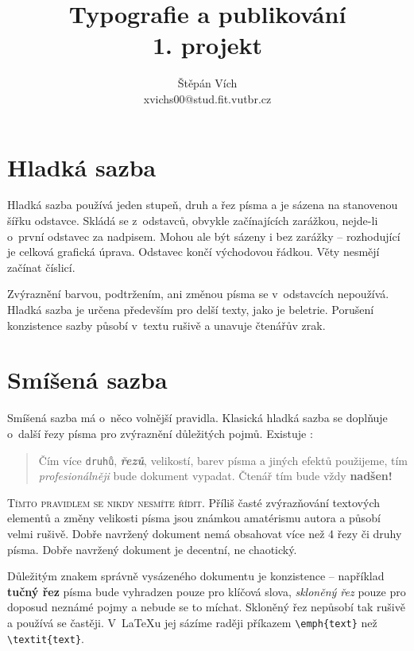 \documentclass[twocolumn, a4paper]{article}
\begin{document}
\title{Typografie a publikování \\ {\large 1. projekt}}
\author{Štěpán Vích\\xvichs00@stud.fit.vutbr.cz}
\date{}



\maketitle

\section{Hladká sazba}

Hladká sazba používá jeden stupeň, druh a řez písma a je sázena na stanovenou šířku odstavce. Skládá se z~odstavců, obvykle začínajících zarážkou, nejde-li o~první odstavec za nadpisem. Mohou ale být sázeny i bez zarážky -- rozhodující je celková grafická úprava. Odstavec končí východovou řádkou. Věty nesmějí začínat číslicí.

Zvýraznění barvou, podtržením, ani změnou písma se v~odstavcích nepoužívá. Hladká sazba je určena především pro delší texty, jako je beletrie. Porušení konzistence sazby působí v~textu rušivě a unavuje čtenářův zrak.

\section {Smíšená sazba} \label{smisena-sazba}

Smíšená sazba má o~něco volnější pravidla. Klasická hladká sazba se doplňuje o~další řezy písma pro zvýraznění důležitých pojmů. Existuje :


\begin{quotation}
Čím více \texttt{druhů}, \textbf{\textit{řezů}}, velikostí, barev písma { \selectfont a jiných efektů} použijeme, tím \emph{profesionálněji} bude dokument vypadat. Čtenář tím {\tiny bude} vždy {\huge \textbf{nadšen!}}
\end{quotation}

\textsc{Tímto pravidlem se nikdy nesmíte řídit.} Příliš časté zvýrazňování textových elementů a změny velikosti písma jsou známkou amatérismu autora a působí velmi rušivě. Dobře navržený dokument nemá obsahovat více než
4 řezy či druhy písma. Dobře navržený dokument je decentní, ne chaotický.

Důležitým znakem správně vysázeného dokumentu je konzistence -- například \textbf{tučný řez} písma bude vyhradzen pouze pro klíčová slova, \textit{skloněný řez} pouze pro doposud neznámé pojmy a nebude se to míchat. Skloněný řez nepůsobí tak rušivě a používá se častěji. V~\LaTeX u jej sázíme raději příkazem \verb|\emph{text}| než \verb|\textit{text}|.
\end{document}
